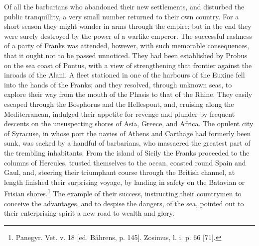 Of all the barbarians who abandoned their new settlements, and disturbed the public tranquillity, a very small number returned to their own country. For a short season they might wander in arms through the empire; but in the end they were surely destroyed by the power of a warlike emperor. The successful rashness of a party of Franks was attended, however, with such memorable consequences, that it ought not to be passed unnoticed. They had been established by Probus on the sea coast of Pontus, with a view of strengthening that frontier against the inroads of the Alani. A fleet stationed in one of the harbours of the Euxine fell into the hands of the Franks; and they resolved, through unknown seas, to explore their way from the mouth of the Phasis to that of the Rhine. They easily escaped through the Bosphorus and the Hellespont, and, cruising along the Mediterranean, indulged their appetite for revenge and plunder by frequent descents on the unsuspecting shores of Asia, Greece, and Africa. The opulent city of Syracuse, in whose port the navies of Athens and Carthage had formerly been sunk, was sacked by a handful of barbarians, who massacred the greatest part of the trembling inhabitants. From the island of Sicily the Franks proceeded to the columns of Hercules, trusted themselves to the ocean, coasted round Spain and Gaul, and, steering their triumphant course through the British channel, at length finished their surprising voyage, by landing in safety on the Batavian or Frisian shores.\footnote{Panegyr. Vet. v. 18 [ed. Bährens, p. 145]. Zosimus, l. i. p. 66 [71].} The example of their success, instructing their countrymen to conceive the advantages, and to despise the dangers, of the sea, pointed out to their enterprising spirit a new road to wealth and glory.

